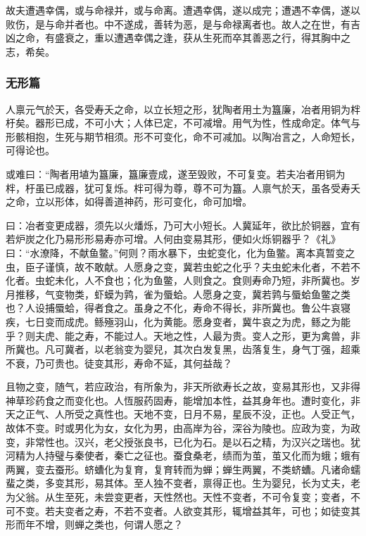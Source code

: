 \documentclass[]{article}
\begin{document}
故夫遭遇幸偶，或与命禄并，或与命离。遭遇幸偶，遂以成完；遭遇不幸偶，遂以败伤，是与命并者也。中不遂成，善转为恶，是与命禄离者也。故人之在世，有吉凶之命，有盛衰之，重以遭遇幸偶之逢，获从生死而卒其善恶之行，得其胸中之志，希矣。

\hypertarget{header-n70}{%
\subsubsection{无形篇}\label{header-n70}}

人禀元气於天，各受寿夭之命，以立长短之形，犹陶者用土为簋廉，冶者用铜为柈杅矣。器形已成，不可小大；人体已定，不可减增。用气为性，性成命定。体气与形骸相抱，生死与期节相须。形不可变化，命不可减加。以陶冶言之，人命短长，可得论也。

或难曰：``陶者用埴为簋廉，簋廉壹成，遂至毁败，不可复变。若夫冶者用铜为柈，杅虽已成器，犹可复烁。柈可得为尊，尊不可为簋。人禀气於天，虽各受寿夭之命，立以形体，如得善道神药，形可变化，命可加增。

曰：冶者变更成器，须先以火燔烁，乃可大小短长。人冀延年，欲比於铜器，宜有若炉炭之化乃易形形易寿亦可增。人何由变易其形，便如火烁铜器乎？《礼》曰：``水潦降，不献鱼鳖。''何则？雨水暴下，虫蛇变化，化为鱼鳖。离本真暂变之虫，臣子谨慎，故不敢献。人愿身之变，冀若虫蛇之化乎？夫虫蛇未化者，不若不化者。虫蛇未化，人不食也；化为鱼鳖，人则食之。食则寿命乃短，非所冀也。岁月推移，气变物类，虾蟆为鹑，雀为蜃蛤。人愿身之变，冀若鹑与蜃蛤鱼鳖之类也？人设捕蜃蛤，得者食之。虽身之不化，寿命不得长，非所冀也。鲁公牛哀寝疾，七日变而成虎。鲧殛羽山，化为黄能。愿身变者，冀牛哀之为虎，鲧之为能乎？则夫虎、能之寿，不能过人。天地之性，人最为贵。变人之形，更为禽兽，非所冀也。凡可冀者，以老翁变为婴兒，其次白发复黑，齿落复生，身气丁强，超乘不衰，乃可贵也。徒变其形，寿命不延，其何益哉？

且物之变，随气，若应政治，有所象为，非天所欲寿长之故，变易其形也，又非得神草珍药食之而变化也。人恆服药固寿，能增加本性，益其身年也。遭时变化，非天之正气、人所受之真性也。天地不变，日月不易，星辰不没，正也。人受正气，故体不变。时或男化为女，女化为男，由高岸为谷，深谷为陵也。应政为变，为政变，非常性也。汉兴，老父授张良书，已化为石。是以石之精，为汉兴之瑞也。犹河精为人持璧与秦使者，秦亡之征也。蚕食桑老，绩而为茧，茧又化而为蛾；蛾有两翼，变去蚕形。蛴螬化为复育，复育转而为蝉；蝉生两翼，不类蛴螬。凡诸命蠕蜚之类，多变其形，易其体。至人独不变者，禀得正也。生为婴兒，长为丈夫，老为父翁。从生至死，未尝变更者，天性然也。天性不变者，不可令复变；变者，不可不变。若夫变者之寿，不若不变者。人欲变其形，辄增益其年，可也；如徒变其形而年不增，则蝉之类也，何谓人愿之？
\end{document}
